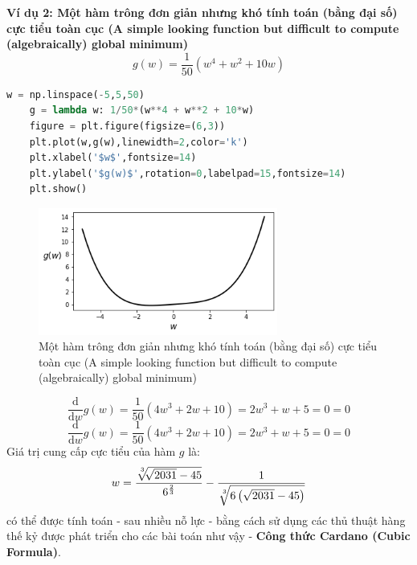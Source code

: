 \documentclass{book}
\begin{document}
\textbf{Ví dụ 2: Một hàm trông đơn giản nhưng khó tính toán (bằng đại số) cực tiểu toàn cục (A simple looking function but difficult to compute (algebraically) global minimum)}
\begin{equation*}
g(w) = \frac{1}{50}\left(w^4 + w^2 + 10w\right)
\end{equation*}
\begin{lstlisting}[language=Python,  label={code:stationary_points}]
    w = np.linspace(-5,5,50)
    g = lambda w: 1/50*(w**4 + w**2 + 10*w)
    figure = plt.figure(figsize=(6,3))
    plt.plot(w,g(w),linewidth=2,color='k')
    plt.xlabel('$w$',fontsize=14)
    plt.ylabel('$g(w)$',rotation=0,labelpad=15,fontsize=14)
    plt.show()
\end{lstlisting}
\begin{figure}[H]
    \centering
    \includegraphics[width=0.7\textwidth]{images/algebraically_global_minimum.png}
    \caption{Một hàm trông đơn giản nhưng khó tính toán (bằng đại số) cực tiểu toàn cục (A simple looking function but difficult to compute (algebraically) global minimum)}
    \label{fig:algebraically_global_minimum}
\end{figure}
\begin{equation*}
    \frac{\mathrm{d}}{\mathrm{d} w}g(w) = \frac{1}{50}\left(4w^3 + 2w + 10\right) = 2w^3 + w + 5 = 0 = 0
\end{equation*}
\begin{equation*}
    \frac{\mathrm{d}}{\mathrm{d} w}g(w) = \frac{1}{50}\left(4w^3 + 2w + 10\right) = 2w^3 + w + 5 = 0 = 0
\end{equation*}
Giá trị cung cấp cực tiểu của hàm $g$ là:
\begin{equation*}
    w = \frac{\sqrt[\leftroot{-2}\uproot{2}3]{\sqrt[\leftroot{-2}\uproot{2}]{2031} - 45}}{6^{\frac{2}{3}}} - \frac{1}{\sqrt[\leftroot{-2}\uproot{2}3]{6\left(\sqrt{2031}-45\right)}}
\end{equation*}
có thể được tính toán - sau nhiều nỗ lực - bằng cách sử dụng các thủ thuật hàng thế kỷ được phát triển cho các bài toán như vậy - \textbf{Công thức Cardano (Cubic Formula)}.
\end{document}

